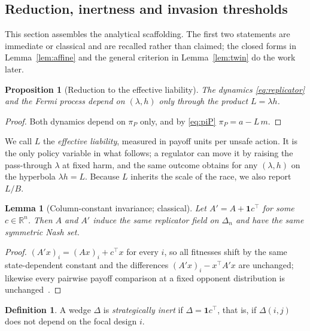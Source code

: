 \documentclass[11pt,a4paper]{article}
\newtheorem{proposition}[theorem]{Proposition}
\newtheorem{lemma}[theorem]{Lemma}
\theoremstyle{definition}
\newtheorem{definition}[theorem]{Definition}
\newcommand{\piP}{\pi_{P}}
\newcommand{\R}{\mathbb{R}}
\newcommand{\Simplex}{\Delta_{n}}
\begin{document}
\subsection{Reduction, inertness and invasion thresholds}

This section assembles the analytical scaffolding. The first two statements
are immediate or classical and are recalled rather than claimed; the closed
forms in Lemma~\ref{lem:affine} and the general criterion in
Lemma~\ref{lem:twin} do the work later.

\begin{proposition}[Reduction to the effective liability]\label{prop:reduction}
The dynamics \eqref{eq:replicator} and the Fermi process depend on
$(\lambda,h)$ only through the product $L=\lambda h$.
\end{proposition}

\begin{proof}
Both dynamics depend on $\piP$ only, and by \eqref{eq:piP} $\piP=a-L\,m$.
\end{proof}

We call $L$ the \emph{effective liability}, measured in payoff units per
unsafe action. It is the only policy variable in what follows; a regulator can
move it by raising the pass-through $\lambda$ at fixed harm, and the same
outcome obtains for any $(\lambda,h)$ on the hyperbola $\lambda h=L$. Because
$L$ inherits the scale of the race, we also report $L/B$.

\begin{lemma}[Column-constant invariance; classical]\label{lem:column}
Let $A'=A+\mathbf{1}c^{\top}$ for some $c\in\R^{n}$. Then $A$ and $A'$ induce
the same replicator field on $\Simplex$ and have the same symmetric Nash set.
\end{lemma}

\begin{proof}
$(A'x)_i=(Ax)_i+c^{\top}x$ for every $i$, so all fitnesses shift by the same
state-dependent constant and the differences $(A'x)_i-x^{\top}A'x$ are
unchanged; likewise every pairwise payoff comparison at a fixed opponent
distribution is unchanged~\citep{hofbauer1998evolutionary}.
\end{proof}

\begin{definition}
A wedge $\Delta$ is \emph{strategically inert} if $\Delta=\mathbf{1}c^{\top}$,
that is, if $\Delta(i,j)$ does not depend on the focal design $i$.
\end{definition}
\end{document}
